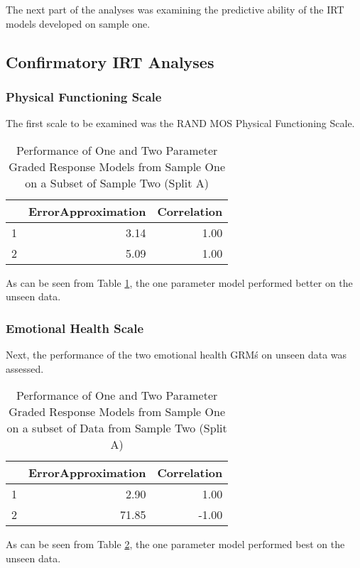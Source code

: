 \documentclass{article}
\begin{document}
The next part of the analyses was examining the predictive ability of the IRT models developed on sample one.

\subsection{Confirmatory IRT Analyses}
\label{sec:conf-irt-analys}

\subsubsection{Physical Functioning Scale}
\label{sec:phys-funct-scale}



The first scale to be examined was the RAND MOS Physical Functioning Scale. 

\begin{table}[ht]
\centering
\begin{tabular}{rrr}
  \hline
 & ErrorApproximation & Correlation \\ 
  \hline
1 & 3.14 & 1.00 \\ 
  2 & 5.09 & 1.00 \\ 
   \hline
\end{tabular}
\caption{Performance of One and Two Parameter Graded Response Models from Sample One on a Subset of Sample Two (Split A)} 
\label{tab:hom1physfungrmtest}
\end{table}
As can be seen from Table \ref{tab:hom1physfungrmtest}, the one parameter model performed better on the unseen data. 

\subsubsection{Emotional Health Scale}
\label{sec:emot-health-scale}



Next, the performance of the two emotional health GRM\'s on unseen data was assessed. 
\begin{table}[ht]
\centering
\begin{tabular}{rrr}
  \hline
 & ErrorApproximation & Correlation \\ 
  \hline
1 & 2.90 & 1.00 \\ 
  2 & 71.85 & -1.00 \\ 
   \hline
\end{tabular}
\caption{Performance of One and Two Parameter Graded Response Models from Sample One on a subset of Data from Sample Two (Split A)} 
\label{tab:hom1emhealthgrmtest}
\end{table}
As can be seen from Table \ref{tab:hom1emhealthgrmtest}, the one parameter model performed best on the unseen data.
\end{document}
